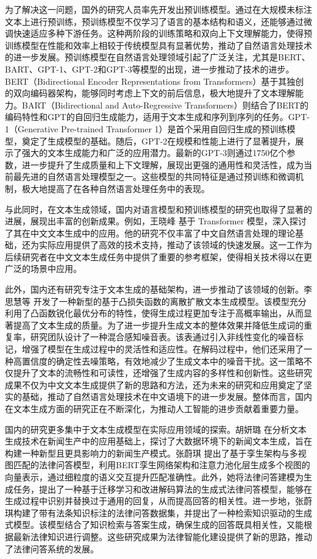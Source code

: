 为了解决这一问题，国外的研究人员率先开发出预训练模型。通过在大规模未标注文本上进行预训练，预训练模型不仅学习了语言的基本结构和语义，还能够通过微调快速适应多种下游任务。这种两阶段的训练策略和双向上下文理解能力，使得预训练模型在性能和效率上相较于传统模型具有显著优势，推动了自然语言处理技术的进一步发展。预训练模型在自然语言处理领域引起了广泛关注，尤其是BERT\cite{devlin_bert_2019}、BART\cite{lewis-etal-2020-bart}、GPT-1\cite{gpt}、GPT-2\cite{gpt2}和GPT-3\cite{gpt3}等模型的出现，进一步推动了技术的进步。BERT（Bidirectional Encoder Representations from Transformers）基于其独创的双向编码器架构，能够同时考虑上下文的前后信息，极大地提升了文本理解能力。BART（Bidirectional and Auto-Regressive Transformers）则结合了BERT的编码特性和GPT的自回归生成能力，适用于文本生成和序列到序列的任务。GPT-1（Generative Pre-trained Transformer 1）是首个采用自回归生成的预训练模型，奠定了生成模型的基础。随后，GPT-2在规模和性能上进行了显著提升，展示了强大的文本生成能力和广泛的应用潜力。最新的GPT-3则通过1750亿个参数，进一步提升了生成质量和上下文理解，展现出更强的通用性和灵活性，成为当前最先进的自然语言处理模型之一。这些模型的共同特征是通过预训练和微调机制，极大地提高了在各种自然语言处理任务中的表现。

与此同时，在文本生成领域，国内对语言模型和预训练模型的研究也取得了显著的进展，展现出丰富的创新成果。例如，王晓峰 \cite{transformer-cn} 基于 Transformer 模型，深入探讨了其在中文文本生成中的应用。他的研究不仅丰富了中文自然语言处理的理论基础，还为实际应用提供了高效的技术支持，推动了该领域的快速发展。这一工作为后续研究者在中文文本生成任务中提供了重要的参考框架，使得相关技术得以在更广泛的场景中应用。

此外，国内还有研究专注于文本生成的基础架构，进一步推动了该领域的创新。李思慧等 \cite{lisihui-textgenerate} 开发了一种新型的基于凸损失函数的离散扩散文本生成模型。该模型充分利用了凸函数锐化最优分布的特性，使得生成过程更加专注于高概率输出，从而显著提高了文本生成的质量。为了进一步提升生成文本的整体效果并降低生成词的重复率，研究团队设计了一种混合感知噪音表。该表通过引入非线性变化的噪音标记，增强了模型在生成过程中的灵活性和适应性。在解码过程中，他们还采用了一种高置信度的确定性去噪策略，有效地减少了生成文本中的噪音干扰。这一策略不仅提升了文本的流畅性和可读性，还增强了生成内容的多样性和创新性。这些研究成果不仅为中文文本生成提供了新的思路和方法，还为未来的研究和应用奠定了坚实的基础，推动了自然语言处理技术在中文语境下的进一步发展。整体而言，国内在文本生成方面的研究正在不断深化，为推动人工智能的进步贡献着重要力量。

国内的研究更多集中于文本生成模型在实际应用领域的探索。胡妍璐 \cite{huyanlu-textgenerate-news} 在分析文本生成技术在新闻生产中的应用基础上，探讨了大数据环境下的新闻文本生成，旨在构建一种新型且更具影响力的新闻生产模式。张蔚琪 \cite{zhangweiqi} 提出了基于孪生架构与多视图匹配的法律问答模型，利用BERT孪生网络架构和注意力池化层生成多个视图的向量表示，通过细粒度的语义交互提升匹配准确性。此外，她将法律问答建模为生成任务，提出了一种基于迁移学习和改进解码算法的生成式法律问答模型，能够在生成过程中识别并替换过于通用的回复，从而提高回答的相关性。进一步地，张蔚琪构建了带有法条知识标注的法律问答数据集，并提出了一种检索知识驱动的生成式模型。该模型结合了知识检索与答案生成，确保生成的回答既具相关性，又能根据最新法律知识进行调整。这些研究成果为法律智能化建设提供了新的思路，推动了法律问答系统的发展。

